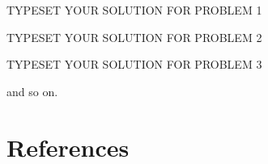 \documentclass[fleqn,letterpaper,12pt]{report}
\begin{document}
\assignmenttitle

%
{}
\problem
TYPESET YOUR SOLUTION FOR PROBLEM 1

%
\newpage
{}
{}
\problem
TYPESET YOUR SOLUTION FOR PROBLEM 2

%
\newpage
{}
{}
\problem
TYPESET YOUR SOLUTION FOR PROBLEM 3

\vfill
and so on.

\newpage
{}
\section*{References}


\end{document}

